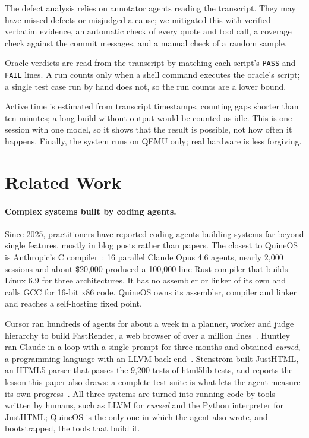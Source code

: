 \documentclass{article}
\newcommand{\sysname}{QuineOS}
\begin{document}
The defect analysis relies on annotator agents reading the transcript. They may have
missed defects or misjudged a cause; we mitigated this with verified verbatim
evidence, an automatic check of every quote and tool call, a coverage check against
the commit messages, and a manual check of a random sample. 

Oracle verdicts are read from the transcript by matching each
script's \texttt{PASS} and \texttt{FAIL} lines. A run counts only when a shell command
executes the oracle's script; a single test case run by hand does not, so the run counts
are a lower bound.

Active time is
estimated from transcript timestamps, counting gaps shorter than ten minutes; a long
build without output would be counted as idle. This is one session with one model, so
it shows that the result is possible, not how often it happens. Finally, the system runs
on QEMU only; real hardware is less forgiving.

\section{Related Work}\label{sec:related}

\paragraph{Complex systems built by coding agents.} Since 2025, practitioners have
reported coding agents building systems far beyond single features, mostly in blog posts
rather than papers. The closest to \sysname{} is Anthropic's C compiler~\cite{carlini2026ccc}:
16 parallel Claude Opus 4.6 agents, nearly 2{,}000 sessions and about \$20{,}000 produced a
100{,}000-line Rust compiler that builds Linux 6.9 for three architectures. It has no
assembler or linker of its own and calls GCC for 16-bit x86 code.
\sysname{} owns its assembler, compiler and linker and reaches a self-hosting fixed point. 

Cursor ran hundreds of
agents for about a week in a planner, worker and judge hierarchy to build FastRender, a
web browser of over a million lines~\cite{lin2026scaling}. Huntley ran Claude in a loop
with a single prompt for three months and obtained \emph{cursed}, a programming language
with an LLVM back end~\cite{huntley2025cursed}. Stenström built JustHTML, an HTML5 parser
that passes the 9{,}200 tests of html5lib-tests, and reports the lesson this paper also
draws: a complete test suite is what lets the agent measure its own
progress~\cite{stenstrom2025justhtml}. All three systems are turned into running code by
tools written by humans, such as LLVM for \emph{cursed} and the Python interpreter for
JustHTML; \sysname{} is the only one in which the agent also wrote, and bootstrapped, the
tools that build it.
\end{document}
